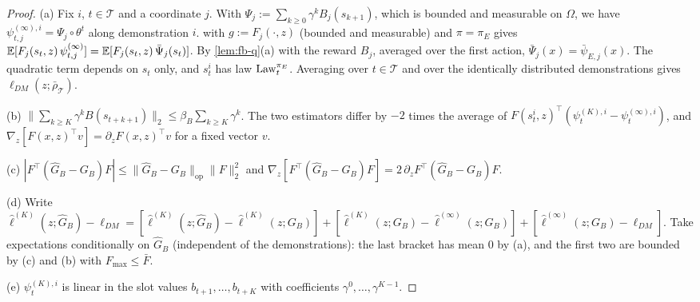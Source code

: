 \begin{proof}
(a) Fix $i$, $t\in\mathcal T$ and a coordinate $j$. With $\Psi_j:=\sum_{k\ge0}\gamma^kB_j(s_{k+1})$, which is bounded and measurable on $\Omega$, we have $\psi^{(\infty),i}_{t,j}=\Psi_j\circ\theta^t$ along demonstration $i$.
 with $g:=F_j(\cdot,z)$ (bounded and measurable) and $\pi=\pi_E$ gives $\mathbb{E}[F_j(s_t,z)\,\psi^{(\infty)}_{t,j}]=\mathbb{E}[F_j(s_t,z)\,\bar\Psi_j(s_t)]$.
By \cref{lem:fb-q}(a) with the reward $B_j$, averaged over the first action, $\bar\Psi_j(x)=\bar\psi_{E,j}(x)$.
The quadratic term depends on $s_t$ only, and $s^i_t$ has law $\mathrm{Law}^{\pi_E}_t$.
Averaging over $t\in\mathcal T$ and over the identically distributed demonstrations gives $\ell_{DM}(z;\bar\rho_{\mathcal T})$.

(b) $\|\sum_{k\ge K}\gamma^kB(s_{t+k+1})\|_2\le\beta_B\sum_{k\ge K}\gamma^k$.
The two estimators differ by $-2$ times the average of $F(s^i_t,z)^\top(\psi^{(K),i}_t-\psi^{(\infty),i}_t)$, and $\nabla_z[F(x,z)^\top v]=\partial_zF(x,z)^\top v$ for a fixed vector $v$.

(c) $|F^\top(\hat G_B-G_B)F|\le\|\hat G_B-G_B\|_{\mathrm{op}}\|F\|_2^2$ and $\nabla_z[F^\top(\hat G_B-G_B)F]=2\,\partial_zF^\top(\hat G_B-G_B)F$.

(d) Write $\hat\ell^{(K)}(z;\hat G_B)-\ell_{DM}=[\hat\ell^{(K)}(z;\hat G_B)-\hat\ell^{(K)}(z;G_B)]+[\hat\ell^{(K)}(z;G_B)-\hat\ell^{(\infty)}(z;G_B)]+[\hat\ell^{(\infty)}(z;G_B)-\ell_{DM}]$. Take expectations conditionally on $\hat G_B$ (independent of the demonstrations): the last bracket has mean $0$ by (a), and the first two are bounded by (c) and (b) with $F_{\max}\le\bar F$.

(e) $\psi^{(K),i}_t$ is linear in the slot values $b_{t+1},\dots,b_{t+K}$ with coefficients $\gamma^0,\dots,\gamma^{K-1}$.
\end{proof}


